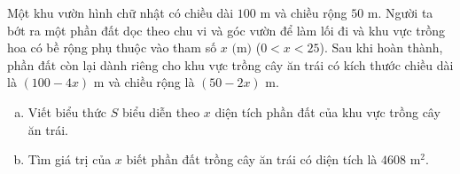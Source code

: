 \begin{bt}%
Một khu vườn hình chữ nhật có chiều dài $100\text{ m}$ và chiều rộng $50\text{ m}$. Người ta bớt ra một phần đất dọc theo chu vi và góc vườn để làm lối đi và khu vực trồng hoa có bề rộng phụ thuộc vào tham số $x\text{ (m)}$ ($0 < x < 25$). Sau khi hoàn thành, phần đất còn lại dành riêng cho khu vực trồng cây ăn trái có kích thước chiều dài là $(100 - 4x)\text{ m}$ và chiều rộng là $(50 - 2x)\text{ m}$.
\begin{enumerate}[a)]
	\item Viết biểu thức $S$ biểu diễn theo $x$ diện tích phần đất của khu vực trồng cây ăn trái.
	\item Tìm giá trị của $x$ biết phần đất trồng cây ăn trái có diện tích là $4608\text{ m}^2$.
\end{enumerate}
\end{bt}

